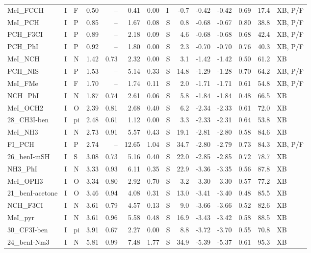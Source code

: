 \documentclass[journal=jcisd8,manuscript=suppinfo]{achemso}
\begin{document}
\begin{singlespace}
{\begin{longtable}{lllrrrrlrrrrrl}
MeI\_FCCH & I & F & 0.50 & -- & 0.41 & 0.00 & I & -0.7 & -0.42 & -0.42 & 0.69 & 17.4 & XB, P/F\\
MeI\_PCH & I & P & 0.85 & -- & 1.67 & 0.08 & S & 0.8 & -0.68 & -0.67 & 0.80 & 38.8 & XB, P/F\\
PCH\_F3CI & I & P & 0.89 & -- & 2.18 & 0.09 & S & 4.6 & -0.68 & -0.68 & 0.68 & 42.4 & XB, P/F\\
PCH\_PhI & I & P & 0.92 & -- & 1.80 & 0.00 & S & 2.3 & -0.70 & -0.70 & 0.76 & 40.3 & XB, P/F\\
MeI\_NCH & I & N & 1.42 & 0.73 & 2.32 & 0.00 & S & 3.1 & -1.42 & -1.42 & 0.50 & 61.2 & XB\\
PCH\_NIS & I & P & 1.53 & -- & 5.14 & 0.33 & S & 14.8 & -1.29 & -1.28 & 0.70 & 64.2 & XB, P/F\\
MeI\_FMe & I & F & 1.70 & -- & 1.74 & 0.11 & S & 2.0 & -1.71 & -1.71 & 0.61 & 54.8 & XB, P/F\\
NCH\_PhI & I & N & 1.87 & 0.74 & 2.61 & 0.06 & S & 5.8 & -1.84 & -1.84 & 0.48 & 66.5 & XB\\
MeI\_OCH2 & I & O & 2.39 & 0.81 & 2.68 & 0.40 & S & 6.2 & -2.34 & -2.33 & 0.61 & 72.0 & XB\\
28\_CH3I-ben & I & pi & 2.48 & 0.61 & 1.12 & 0.00 & S & 3.3 & -2.33 & -2.31 & 0.64 & 53.8 & XB\\
MeI\_NH3 & I & N & 2.73 & 0.91 & 5.57 & 0.43 & S & 19.1 & -2.81 & -2.80 & 0.58 & 84.6 & XB\\
FI\_PCH & I & P & 2.74 & -- & 12.65 & 1.04 & S & 34.7 & -2.80 & -2.79 & 0.73 & 84.3 & XB, P/F\\
26\_benI-mSH & I & S & 3.08 & 0.73 & 5.16 & 0.40 & S & 22.0 & -2.85 & -2.85 & 0.72 & 78.7 & XB\\
NH3\_PhI & I & N & 3.33 & 0.93 & 6.11 & 0.35 & S & 22.9 & -3.36 & -3.35 & 0.56 & 87.8 & XB\\
MeI\_OPH3 & I & O & 3.34 & 0.80 & 2.92 & 0.70 & S & 3.2 & -3.30 & -3.30 & 0.57 & 77.2 & XB\\
21\_benI-acetone & I & O & 3.46 & 0.94 & 4.08 & 0.31 & S & 13.0 & -3.41 & -3.40 & 0.48 & 85.5 & XB\\
NCH\_F3CI & I & N & 3.61 & 0.79 & 4.57 & 0.13 & S & 9.0 & -3.66 & -3.66 & 0.52 & 82.6 & XB\\
MeI\_pyr & I & N & 3.61 & 0.96 & 5.58 & 0.48 & S & 16.9 & -3.43 & -3.42 & 0.58 & 88.5 & XB\\
30\_CF3I-ben & I & pi & 3.91 & 0.67 & 2.27 & 0.00 & S & 8.8 & -3.72 & -3.70 & 0.55 & 70.8 & XB\\
24\_benI-Nm3 & I & N & 5.81 & 0.99 & 7.48 & 1.77 & S & 34.9 & -5.39 & -5.37 & 0.61 & 95.3 & XB\\

\end{longtable}}
\end{singlespace}
\end{document}

